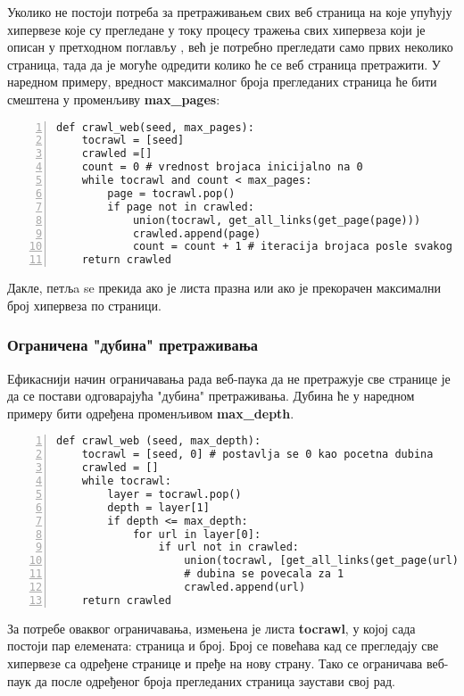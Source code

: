 Уколико не постоји потреба за претраживањем свих веб страница на које упућују хипервезе које су прегледане у току процесу тражења свих хипервеза који је описан у претходном поглављу , већ је потребно прегледати само првих неколико страница, тада да је могуће одредити колико ће се веб страница претражити. У наредном примеру, вредност максималног броја прегледаних страница ће бити смештена у променљиву \textbf{max\_pages}:

\begin{lstlisting}[caption=Претраживање са ограниченим бројем страна, label={lst:crawlweb2}, numbers=left]
def crawl_web(seed, max_pages):
    tocrawl = [seed]
    crawled =[]
    count = 0 # vrednost brojaca inicijalno na 0
    while tocrawl and count < max_pages:
        page = tocrawl.pop()
        if page not in crawled:
            union(tocrawl, get_all_links(get_page(page)))
            crawled.append(page)
            count = count + 1 # iteracija brojaca posle svakog linka
    return crawled
\end{lstlisting}

Дакле, петљa se прекида ако је листа празна или ако је прекорачен максимални број хипервеза по страници.

\subsubsection{Ограничена "дубина" претраживања}

Ефикаснији начин ограничавања рада веб-паука да не претражује све странице је да се постави одговарајућа "дубина" претраживања. Дубина ће у наредном примеру бити одређена променљивом \textbf{max\_depth}.

\begin{lstlisting}[caption=Скенирање ограничено по дубини, label={lst:crawlweb3}, numbers=left]
def crawl_web (seed, max_depth):
    tocrawl = [seed, 0] # postavlja se 0 kao pocetna dubina
    crawled = []
    while tocrawl:
        layer = tocrawl.pop()
        depth = layer[1]
        if depth <= max_depth:
            for url in layer[0]:
                if url not in crawled:
                    union(tocrawl, [get_all_links(get_page(url)),depth+1])
                    # dubina se povecala za 1
                    crawled.append(url)
    return crawled
\end{lstlisting}

За потребе оваквог ограничавања, измењена је листа \textbf{tocrawl}, у којој сада постоји пар елемената: страница и број. Број се повећава кад се прегледају све хипервезе са одређене странице и пређе на нову страну. Тако се  ограничава веб-паук да после одређеног броја прегледаних страница заустави свој рад.
\pagebreak
